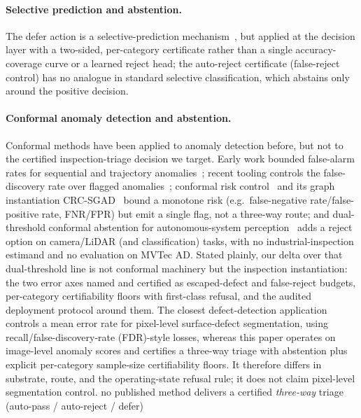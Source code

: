 \documentclass[preprint,11pt]{elsarticle}
\begin{document}
\paragraph{Selective prediction and abstention.} The defer action is a selective-prediction
mechanism~\citep{geifman2017selective,geifman2019selectivenet}, but applied at the decision layer
with a two-sided, per-category certificate rather than a single accuracy-coverage curve or a learned
reject head; the auto-reject certificate (false-reject control) has no analogue in standard
selective classification, which abstains only around the positive decision.

\paragraph{Conformal anomaly detection and abstention.} Conformal methods have been applied to
anomaly detection before, but not to the certified inspection-triage decision we target. Early
work bounded false-alarm rates for sequential and trajectory
anomalies~\citep{laxhammar2011sequential,laxhammar2015inductive}; recent tooling controls the
false-discovery rate over flagged anomalies~\citep{hennhofer2026nonconform}; conformal risk
control~\citep{angelopoulos2022crc} and its graph instantiation
CRC-SGAD~\citep{bai2025crcsgad} bound a monotone risk (e.g.\ false-negative rate/false-positive rate, FNR/FPR) but emit a single flag, not
a three-way route; and dual-threshold conformal abstention for autonomous-system
perception~\citep{kumar2025beyond} adds a reject option on camera/LiDAR (and classification)
tasks, with no industrial-inspection estimand and no evaluation on MVTec AD. Stated plainly,
our delta over that dual-threshold line is not conformal machinery but the inspection
instantiation: the two error axes named and certified as escaped-defect and false-reject
budgets, per-category certifiability floors with first-class refusal, and the audited
deployment protocol around them. The closest defect-detection application~\citep{shen2025conformal} controls a mean error rate for
pixel-level surface-defect segmentation, using recall/false-discovery-rate (FDR)-style losses, whereas this paper
operates on image-level anomaly scores and certifies a three-way triage with abstention plus
explicit per-category sample-size certifiability floors. It therefore differs in substrate,
route, and the operating-state refusal rule; it does not claim pixel-level segmentation
control.
no published method delivers a certified \emph{three-way} triage (auto-pass / auto-reject / defer)
\end{document}

